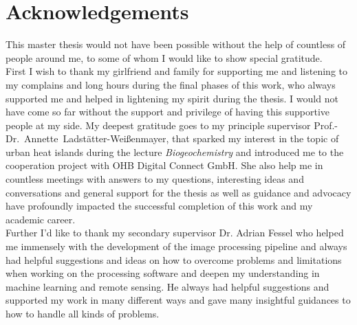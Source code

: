 \section*{Acknowledgements}
This master thesis would not have been possible without the help of countless of people around me, to some of whom I would like to show special gratitude. \\
%
First I wish to thank my girlfriend and family for supporting me and listening to my complains and long hours during the final phases of this work, who always supported me and helped in lightening my spirit during the thesis. I would not have come so far without the support and privilege of having this supportive people at my side.
%
My deepest gratitude goes to my principle supervisor Prof.-Dr.~Annette~Ladstätter-Weißenmayer, that sparked my interest in the topic of urban heat islands during the lecture \textit{Biogeochemistry} and introduced me to the cooperation project with OHB Digital Connect GmbH. 
She also help me in countless meetings with answers to my questions, interesting ideas and conversations and general support for the thesis as well as guidance and advocacy have profoundly impacted the successful completion of this work and my academic career. \\ 
%
Further I'd like to thank my secondary supervisor Dr. Adrian Fessel who helped me immensely with the development of the image processing pipeline and always had helpful suggestions and ideas on how to overcome problems and limitations when working on the processing software and deepen my understanding in machine learning and remote sensing. 
He always had helpful suggestions and supported my work in many different ways and gave many insightful guidances to how to handle all kinds of problems.
%





\newpage
